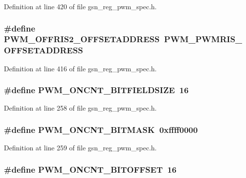 Definition at line 420 of file gsn\_\-reg\_\-pwm\_\-spec.h.

\hypertarget{a00565_ab3ad5b76de2aa9acfbc01708c2f516f4}{
\subsubsection[{PWM\_\-OFFRIS2\_\-OFFSETADDRESS}]{\setlength{\rightskip}{0pt plus 5cm}\#define PWM\_\-OFFRIS2\_\-OFFSETADDRESS~PWM\_\-PWMRIS\_\-OFFSETADDRESS}}
\label{a00565_ab3ad5b76de2aa9acfbc01708c2f516f4}


Definition at line 416 of file gsn\_\-reg\_\-pwm\_\-spec.h.

\hypertarget{a00565_ac2e2ae1a3f8bed8129a1f3b1c84650b0}{
\subsubsection[{PWM\_\-ONCNT\_\-BITFIELDSIZE}]{\setlength{\rightskip}{0pt plus 5cm}\#define PWM\_\-ONCNT\_\-BITFIELDSIZE~16}}
\label{a00565_ac2e2ae1a3f8bed8129a1f3b1c84650b0}


Definition at line 258 of file gsn\_\-reg\_\-pwm\_\-spec.h.

\hypertarget{a00565_abf8c208ee2db737284329994da3cb497}{
\subsubsection[{PWM\_\-ONCNT\_\-BITMASK}]{\setlength{\rightskip}{0pt plus 5cm}\#define PWM\_\-ONCNT\_\-BITMASK~0xffff0000}}
\label{a00565_abf8c208ee2db737284329994da3cb497}


Definition at line 259 of file gsn\_\-reg\_\-pwm\_\-spec.h.

\hypertarget{a00565_a1e31aee8b02e1ec10576c7baf924a301}{
\subsubsection[{PWM\_\-ONCNT\_\-BITOFFSET}]{\setlength{\rightskip}{0pt plus 5cm}\#define PWM\_\-ONCNT\_\-BITOFFSET~16}}
\label{a00565_a1e31aee8b02e1ec10576c7baf924a301}


